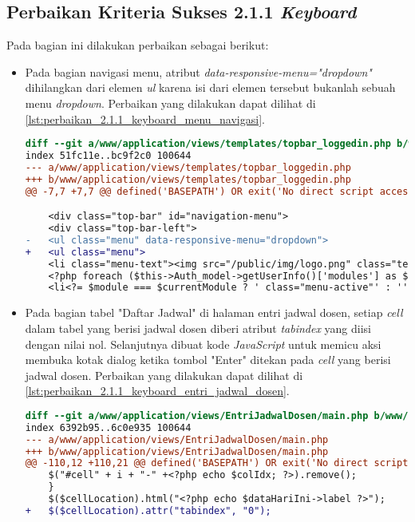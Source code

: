 \subsection{Perbaikan Kriteria Sukses 2.1.1 \textit{Keyboard}}
\label{subsec:perbaikan_kriteria_sukses_2.1.1}
Pada bagian ini dilakukan perbaikan sebagai berikut:

\begin{itemize}
\item Pada bagian navigasi menu, atribut \textit{data-responsive-menu="dropdown"} dihilangkan dari elemen \textit{ul} karena isi dari elemen tersebut bukanlah sebuah menu \textit{dropdown}. Perbaikan yang dilakukan dapat dilihat di \ref{lst:perbaikan_2.1.1_keyboard_menu_navigasi}.
\begin{lstlisting}[frame=single, label={lst:perbaikan_2.1.1_keyboard_menu_navigasi}, language=diff, caption=Perbaikan Kriteria Sukses 2.1.1 - Penggunaan \textit{Keyboard} pada Menu Navigasi]
diff --git a/www/application/views/templates/topbar_loggedin.php b/www/application/views/templates/topbar_loggedin.php
index 51fc11e..bc9f2c0 100644
--- a/www/application/views/templates/topbar_loggedin.php
+++ b/www/application/views/templates/topbar_loggedin.php
@@ -7,7 +7,7 @@ defined('BASEPATH') OR exit('No direct script access allowed');

    <div class="top-bar" id="navigation-menu">
    <div class="top-bar-left">
-   <ul class="menu" data-responsive-menu="dropdown">
+   <ul class="menu">
    <li class="menu-text"><img src="/public/img/logo.png" class="textsized" alt="B"/></li>
    <?php foreach ($this->Auth_model->getUserInfo()['modules'] as $module): ?>
    <li<?= $module === $currentModule ? ' class="menu-active"' : '' ?>><a href="/<?= $module ?>"><?= $this->config->item('module-names')[$module] ?></a></li>
\end{lstlisting}

\item Pada bagian tabel "Daftar Jadwal" di halaman entri jadwal dosen, setiap \textit{cell} dalam tabel yang berisi jadwal dosen diberi atribut \textit{tabindex} yang diisi dengan nilai nol. Selanjutnya dibuat kode \textit{JavaScript} untuk memicu aksi membuka kotak dialog ketika tombol "Enter" ditekan pada \textit{cell} yang berisi jadwal dosen. Perbaikan yang dilakukan dapat dilihat di \ref{lst:perbaikan_2.1.1_keyboard_entri_jadwal_dosen}.
\begin{lstlisting}[frame=single, label={lst:perbaikan_2.1.1_keyboard_entri_jadwal_dosen}, language=diff, caption=Perbaikan Kriteria Sukses 2.1.1 - Penggunaan \textit{Keyboard} pada Halaman Entri Jadwal Dosen]
diff --git a/www/application/views/EntriJadwalDosen/main.php b/www/application/views/EntriJadwalDosen/main.php
index 6392b95..6c0e935 100644
--- a/www/application/views/EntriJadwalDosen/main.php
+++ b/www/application/views/EntriJadwalDosen/main.php
@@ -110,12 +110,21 @@ defined('BASEPATH') OR exit('No direct script access allowed');
    $("#cell" + i + "-" +<?php echo $colIdx; ?>).remove();
    }
    $($cellLocation).html("<?php echo $dataHariIni->label ?>");
+   $($cellLocation).attr("tabindex", "0");


\end{lstlisting}
\end{itemize}
